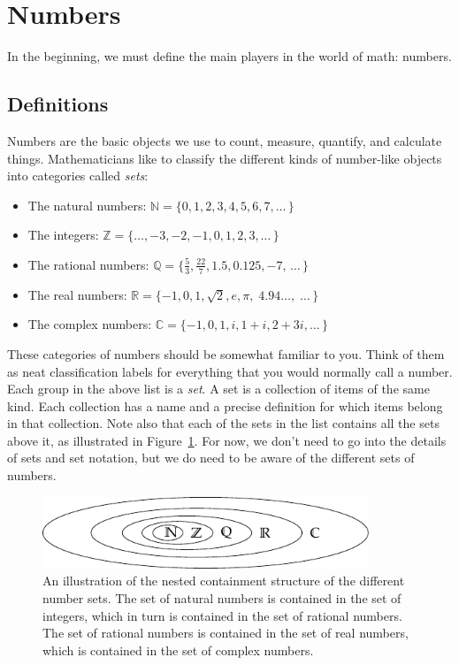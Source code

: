 
\section{Numbers}
\label{sec:numbers}

	In the beginning, we must define the main players in the world of math: numbers.

	\subsection{Definitions}
	\label{numbers:definitions}
		
		Numbers are the basic objects we use to count, measure, quantify, and calculate things.
		Mathematicians like to classify the different kinds of number-like objects into categories called \emph{sets}:					
		\begin{itemize}
			\item  The natural numbers: $\mathbb{N} = \{0,1,2,3,4,5,6,7, \ldots \, \}$
			\item  The integers: $\mathbb{Z} = \{\ldots, -3,-2,-1,0,1,2,3 , \ldots  \, \}$
			\item  The rational numbers: $\mathbb{Q} = \{\frac{5}{3}, \frac{22}{7}, 1.5, 0.125,  -7, \, \ldots \, \}$
			\item  The real numbers: $\mathbb{R} = \{-1,0,1, \sqrt{2}, e,\pi, \;  4.94\ldots, \; \ldots \, \}$
			\item  The complex numbers: $\mathbb{C} = \{ -1, 0, 1, i,  1+i, 2+3i,  \ldots \, \}$
		\end{itemize}
		These categories of numbers should be somewhat familiar to you.
		Think of them as neat classification labels for everything that you would normally call a number. 
	 	Each group in the above list is a \emph{set}.
		A set is a collection of items of the same kind. 
		Each collection has a name and a precise definition for which items belong in that collection.
		Note also that each of the sets in the list contains all the sets above it,												
		as illustrated in Figure~\ref{fig:nested_sets}.
		For now, we don't need to go into the details of sets and set notation,
		but we do need to be aware of the different sets of numbers.

		\begin{figure}[H]
			\centering
			\includegraphics[width=0.87\textwidth]{figures/math/nested_sets.pdf}
			\caption{	An illustration of the nested containment structure of the different number sets.
					The set of natural numbers is contained in the set of integers,
					which in turn is contained in the set of rational numbers.
					The set of rational numbers is contained in the set of real numbers,
					which is contained in the set of complex numbers.}
			\label{fig:nested_sets}
		\end{figure}

